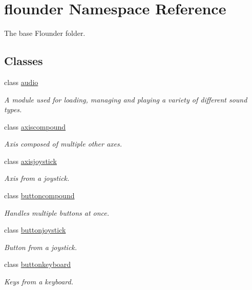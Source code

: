 \hypertarget{namespaceflounder}{}\section{flounder Namespace Reference}
\label{namespaceflounder}


The base Flounder folder.  


\subsection*{Classes}
\begin{DoxyCompactItemize}
\item 
class \hyperlink{classflounder_1_1audio}{audio}
\begin{DoxyCompactList}\small\item\em A module used for loading, managing and playing a variety of different sound types. \end{DoxyCompactList}\item 
class \hyperlink{classflounder_1_1axiscompound}{axiscompound}
\begin{DoxyCompactList}\small\item\em Axis composed of multiple other axes. \end{DoxyCompactList}\item 
class \hyperlink{classflounder_1_1axisjoystick}{axisjoystick}
\begin{DoxyCompactList}\small\item\em Axis from a joystick. \end{DoxyCompactList}\item 
class \hyperlink{classflounder_1_1buttoncompound}{buttoncompound}
\begin{DoxyCompactList}\small\item\em Handles multiple buttons at once. \end{DoxyCompactList}\item 
class \hyperlink{classflounder_1_1buttonjoystick}{buttonjoystick}
\begin{DoxyCompactList}\small\item\em Button from a joystick. \end{DoxyCompactList}\item 
class \hyperlink{classflounder_1_1buttonkeyboard}{buttonkeyboard}
\begin{DoxyCompactList}\small\item\em Keys from a keyboard. \end{DoxyCompactList}\item 

\end{DoxyCompactItemize}
